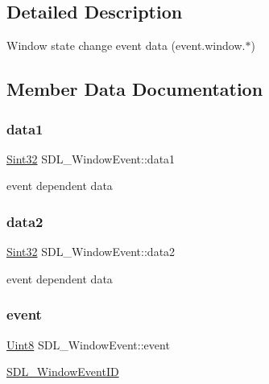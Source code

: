 \subsection{Detailed Description}
Window state change event data (event.\+window.$\ast$) 

\subsection{Member Data Documentation}
\mbox{\label{struct_s_d_l___window_event_a01da0025428d3434c80021f3e4089fec}} 
\subsubsection{\texorpdfstring{data1}{data1}}
{\footnotesize\ttfamily \mbox{\hyperlink{_s_d_l__stdinc_8h_a7a90b941db9d4582e9ad7abb9940ff7e}{Sint32}} S\+D\+L\+\_\+\+Window\+Event\+::data1}

event dependent data \mbox{\label{struct_s_d_l___window_event_af6cd0a21bc9ecadfee42f6a0147d7171}} 
\subsubsection{\texorpdfstring{data2}{data2}}
{\footnotesize\ttfamily \mbox{\hyperlink{_s_d_l__stdinc_8h_a7a90b941db9d4582e9ad7abb9940ff7e}{Sint32}} S\+D\+L\+\_\+\+Window\+Event\+::data2}

event dependent data \mbox{\label{struct_s_d_l___window_event_a485cd1f07f0f22fdb9f4c4bf214011dc}} 
\subsubsection{\texorpdfstring{event}{event}}
{\footnotesize\ttfamily \mbox{\hyperlink{_s_d_l__stdinc_8h_a2944638813a090aa23e62f4da842c3e2}{Uint8}} S\+D\+L\+\_\+\+Window\+Event\+::event}

\mbox{\hyperlink{_s_d_l__video_8h_ac486b40a4860d980dbc74d0b4adf3bab}{S\+D\+L\+\_\+\+Window\+Event\+ID}} \mbox{\label{struct_s_d_l___window_event_a09ee59114246eceed4a281033ec6609b}} 
